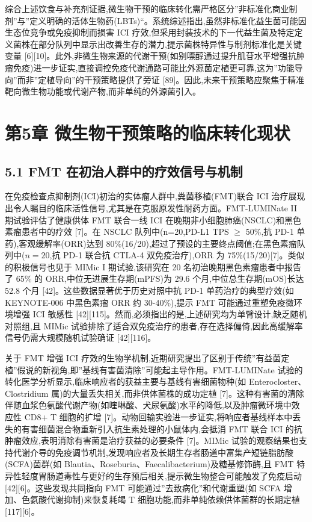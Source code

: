 \documentclass[11pt]{article}
\begin{document}
综合上述饮食与补充剂证据,微生物干预的临床转化需严格区分''非标准化商业制剂''与''定义明确的活体生物药(LBTs)``。系统综述指出,虽然非标准化益生菌可能因生态位竞争或免疫抑制而损害 ICI 疗效,但采用封装技术的下一代益生菌及特定定义菌株在部分队列中显示出改善生存的潜力,提示菌株特异性与制剂标准化是关键变量 {[}6{]}{[}10{]}。此外,非微生物来源的代谢干预(如别嘌醇通过提升肌苷水平增强抗肿瘤免疫)进一步证实,直接调控免疫代谢通路可能比外源菌定植更可靠,这为''功能导向''而非''定植导向''的干预策略提供了旁证 {[}89{]}。因此,未来干预策略应聚焦于精准靶向微生物功能或代谢产物,而非单纯的外源菌引入。

\section{第5章 微生物干预策略的临床转化现状}\label{ux7b2c5ux7ae0-ux5faeux751fux7269ux5e72ux9884ux7b56ux7565ux7684ux4e34ux5e8aux8f6cux5316ux73b0ux72b6}

\subsection{5.1 FMT 在初治人群中的疗效信号与机制}\label{fmt-ux5728ux521dux6cbbux4ebaux7fa4ux4e2dux7684ux7597ux6548ux4fe1ux53f7ux4e0eux673aux5236}

在免疫检查点抑制剂(ICI)初治的实体瘤人群中,粪菌移植(FMT)联合 ICI 治疗展现出令人瞩目的临床活性信号,尤其是在克服原发性耐药方面。FMT-LUMINate II 期试验评估了健康供体 FMT 联合一线 ICI 在晚期非小细胞肺癌(NSCLC)和黑色素瘤患者中的疗效 {[}7{]}。在 NSCLC 队列中(n=20,PD-L1 TPS \(\geq\) 50\%,抗 PD-1 单药),客观缓解率(ORR)达到 80\%(16/20),超过了预设的主要终点阈值;在黑色素瘤队列中(\(n=20\),抗 PD-1 联合抗 CTLA-4 双免疫治疗),ORR 为 75\%(15/20){[}7{]}。类似的积极信号也见于 MIMic I 期试验,该研究在 20 名初治晚期黑色素瘤患者中报告了 65\% 的 ORR,中位无进展生存期(mPFS)为 29.6 个月,中位总生存期(mOS)长达 52.8 个月 {[}42{]}。这些数据显著优于历史对照中抗 PD-1 单药治疗的典型疗效(如 KEYNOTE-006 中黑色素瘤 ORR 约 30-40\%),提示 FMT 可能通过重塑免疫微环境增强 ICI 敏感性 {[}42{]}{[}115{]}。然而,必须指出的是,上述研究均为单臂设计,缺乏随机对照组,且 MIMic 试验排除了适合双免疫治疗的患者,存在选择偏倚,因此高缓解率信号仍需大规模随机试验确证 {[}42{]}{[}116{]}。

关于 FMT 增强 ICI 疗效的生物学机制,近期研究提出了区别于传统''有益菌定植''假说的新视角,即''基线有害菌清除''可能起主导作用。FMT-LUMINate 试验的转化医学分析显示,临床响应者的获益主要与基线有害细菌物种(如 Enterocloster、Clostridium 属)的大量丢失相关,而非供体菌株的成功定植 {[}7{]}。这种有害菌的清除伴随血浆色氨酸代谢产物(如喹啉酸、犬尿氨酸)水平的降低,以及肿瘤微环境中效应性 CD8+ T 细胞的扩增 {[}7{]}。动物回输实验进一步证实,将响应者基线样本中丢失的有害细菌混合物重新引入抗生素处理的小鼠体内,会抵消 FMT 联合 ICI 的抗肿瘤效应,表明消除有害菌是治疗获益的必要条件 {[}7{]}。MIMic 试验的观察结果也支持代谢介导的免疫调节机制,发现响应者及长期生存者肠道中富集产短链脂肪酸(SCFA)菌群(如 Blautia、Roseburia、Faecalibacterium)及糖基修饰酶,且 FMT 特异性轻度胃肠道毒性与更好的生存预后相关,提示微生物整合可能触发了免疫启动 {[}42{]}{[}6{]}。这些发现共同指向 FMT 可能通过''去致病化''和代谢重塑(如 SCFA 增加、色氨酸代谢抑制)来恢复耗竭 T 细胞功能,而非单纯依赖供体菌群的长期定植 {[}117{]}{[}6{]}。
\end{document}
